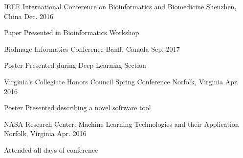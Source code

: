 \begin{cventries}
  \cventrya
    {}
    {IEEE International Conference on Bioinformatics and Biomedicine}
    {Shenzhen, China}
    {Dec. 2016}
    {
        \begin{cvitems}
            \item {Paper Presented in Bioinformatics Workshop}
          \end{cvitems}
    }
\end{cventries}
\vspace{-8mm}
\begin{cventries}
  \cventrya
    {}
    {BioImage Informatics Conference}
    {Banff, Canada}
    {Sep. 2017}
    {
        \begin{cvitems}
            \item {Poster Presented during Deep Learning Section}
          \end{cvitems}
    }
\end{cventries}
\vspace{-8mm}
\begin{cventries}
  \cventrya
    {}
    {Virginia's Collegiate Honors Council Spring Conference}
    {Norfolk, Virginia}
    {Apr. 2016}
    {
        \begin{cvitems}
            \item {Poster Presented describing a novel software tool}
          \end{cvitems}
    }
\end{cventries}
\vspace{-8mm}
\begin{cventries}
  \cventrya
    {}
    {NASA Research Center: Machine Learning Technologies and their Application}
    {Norfolk, Virginia}
    {Apr. 2016}
    {
        \begin{cvitems}
            \item {Attended all days of conference}
          \end{cvitems}
    }
\end{cventries}